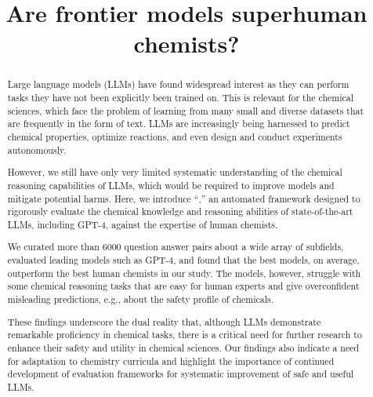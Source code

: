 \documentclass[11pt, oneside]{article}
\title{\textsf{Are frontier models superhuman chemists?}}
\begin{document}
\maketitle

\begin{abstract}
    Large language models (LLMs) have found widespread interest as they can perform tasks they have not been explicitly been trained on. 
    This is relevant for the chemical sciences, which face the problem of learning from many small and diverse datasets that are frequently in the form of text.
    LLMs are increasingly being harnessed to predict chemical properties, optimize reactions, and even design and conduct experiments autonomously.

    However, we still have only very limited systematic understanding of the chemical reasoning capabilities of LLMs, which would be required to improve models and mitigate potential harms. 
    Here, we introduce \enquote{\chembench,} an automated framework designed to rigorously evaluate the chemical knowledge and reasoning abilities of state-of-the-art LLMs, including GPT-4, against the expertise of human chemists.

    We curated more than 6000 question answer pairs about a wide array of subfields, evaluated leading models such as GPT-4, and found that the best models, on average, outperform the best human chemists in our study. 
    The models, however, struggle with some chemical reasoning tasks that are easy for human experts and give overconfident misleading predictions, e.g., about the safety profile of chemicals. 

    These findings underscore the dual reality that, although LLMs demonstrate remarkable proficiency in chemical tasks, there is a critical need for further research to enhance their safety and utility in chemical sciences.
    Our findings also indicate a need for adaptation to chemistry curricula and highlight the importance of continued development of evaluation frameworks for systematic improvement of safe and useful LLMs.
\end{abstract}
\end{document}
